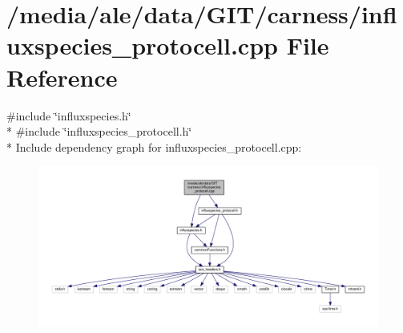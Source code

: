 \hypertarget{a00079}{\section{/media/ale/data/\-G\-I\-T/carness/influxspecies\-\_\-protocell.cpp File Reference}
\label{a00079}
}
{\ttfamily \#include \char`\"{}influxspecies.\-h\char`\"{}}\\*
{\ttfamily \#include \char`\"{}influxspecies\-\_\-protocell.\-h\char`\"{}}\\*
Include dependency graph for influxspecies\-\_\-protocell.\-cpp\-:\nopagebreak
\begin{figure}[H]
\begin{center}
\leavevmode
\includegraphics[width=350pt]{a00151}
\end{center}
\end{figure}
